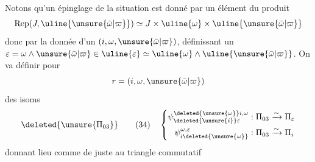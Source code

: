 Notons qu'un épinglage de la situation est donné par un élément du produit
\[
\operatorname{Rep}(J,\uline{\unsure{\bar\omega|\varpi}})\simeq J\times\uline{\omega}\times\uline{\unsure{\bar\omega|\varpi}}
\]
donc par la donnée d'un $(i,\omega,\unsure{\bar\omega|\varpi})$, définissant  un $\varepsilon=\omega\wedge\unsure{\bar\omega|\varpi}\in\uline{\varepsilon}\simeq\uline{\omega}\wedge\uline{\unsure{\bar\omega|\varpi}}$. On va définir pour
\[
r=(i,\omega,\unsure{\bar\omega|\varpi})
\]
des isoms
\[
\deleted{\unsure{\Pi_{03}}}\qquad(34)\quad\left\{\begin{aligned}
\psi_{\deleted{\unsure{i}}\varepsilon}^{\deleted{\unsure{\omega}}i,\omega}&:\Pi_{03}\xrightarrow{\sim}\Pi_\varepsilon\\
\psi_{i\deleted{\unsure{\omega}}}^{\omega,\varepsilon}&:\Pi_{03}\xrightarrow{\sim}\Pi_i
\end{aligned}\right.
\]
donnant lieu comme de juste au triangle commutatif

